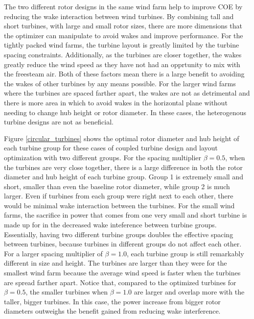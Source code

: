 \documentclass[wes, manuscript]{copernicus}
\begin{document}
The two different rotor designs in the same wind farm help to improve COE by reducing the wake interaction between wind turbines. By combining tall and short turbines, with large and small rotor sizes, there are more dimensions that the optimizer can manipulate to avoid wakes and improve performance. For the tightly packed wind farms, the turbine layout is greatly limited by the turbine spacing constraints. Additionally, as the turbines are closer together, the wakes greatly reduce the wind speed as they have not had an opprtunity to mix with the freesteam air. Both of these factors mean there is a large benefit to avoiding the wakes of other turbines by any means possible. For the larger wind farms where the turbines are spaced farther apart, the wakes are not as detrimental and there is more area in which to avoid wakes in the horizontal plane without needing to change hub height or rotor diameter. In these cases, the heterogenous turbine designs are not as beneficial.

Figure \ref{circular_turbines} shows the optimal rotor diameter and hub height of each turbine group for these cases of coupled turbine design and layout optimization with two different groups. For the spacing multiplier $\beta=0.5$, when the turbines are very close together, there is a large difference in both the rotor diameter and hub height of each turbine group. Group 1 is extremely small and short, smaller than even the baseline rotor diameter, while group 2 is much larger. Even if turbines from each group were right next to each other, there would be minimal wake interaction between the turbines. For the small wind farms, the sacrifice in power that comes from one very small and short turbine is made up for in the decreased wake inteference between turbine groups. Essentially, having two different turbine groups doubles the effective spacing between turbines, because turbines in different groups do not affect each other. For a larger spacing multiplier of $\beta=1.0$, each turbine group is still remarkably different in size and height. The turbines are larger than they were for the smallest wind farm because the average wind speed is faster when the turbines are spread farther apart. Notice that, compared to the optimized turbines for $\beta=0.5$, the smaller turbines when $\beta=1.0$ are larger and overlap more with the taller, bigger turbines. In this case, the power increase from bigger rotor diameters outweighs the benefit gained from reducing wake interference. 
\end{document}
